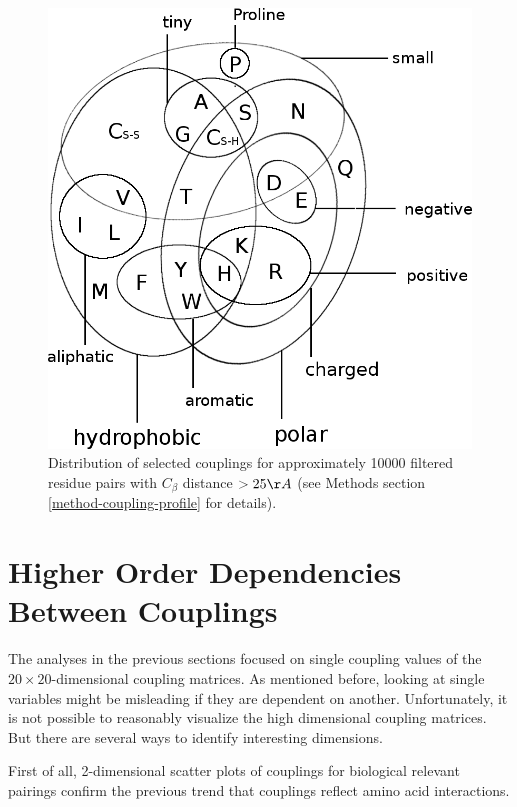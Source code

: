 \documentclass[12pt,a4paper,twoside]{book}
\newcommand{\Cb}{C_\beta}
\theoremstyle{definition}
\theoremstyle{definition}
\theoremstyle{remark}
\begin{document}
\begin{figure}
\includegraphics[width=1\linewidth]{img/amino_acid_physico_chemical_properties_venn_diagramm} \caption{Distribution of selected
couplings for approximately 10000 filtered residue pairs with \(\Cb\)
distance \(> 25\AA\) (see Methods section \ref{method-coupling-profile}
for details).}\label{fig:1d-coupling-profile-20-50}
\end{figure}

\section{Higher Order Dependencies Between
Couplings}\label{higher-order-dependencies-between-couplings}

The analyses in the previous sections focused on single coupling values
of the \(20 \times 20\)-dimensional coupling matrices. As mentioned
before, looking at single variables might be misleading if they are
dependent on another. Unfortunately, it is not possible to reasonably
visualize the high dimensional coupling matrices. But there are several
ways to identify interesting dimensions.

First of all, 2-dimensional scatter plots of couplings for biological
relevant pairings confirm the previous trend that couplings reflect
amino acid interactions.
\end{document}
